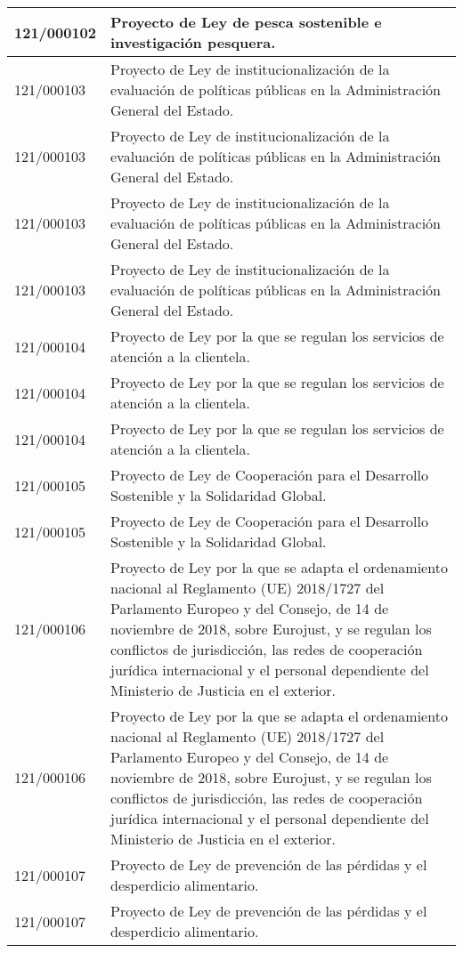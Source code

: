 {\begin{table}[H]
\begin{center}
\begin{tabularx}{\linewidth}{| l | X |}
\hline
121/000102 & Proyecto de Ley de pesca sostenible e investigación pesquera. \\
\hline
121/000103 & Proyecto de Ley de institucionalización de la evaluación de políticas públicas en la Administración General del Estado. \\
\hline
121/000103 & Proyecto de Ley de institucionalización de la evaluación de políticas públicas en la Administración General del Estado. \\
\hline
121/000103 & Proyecto de Ley de institucionalización de la evaluación de políticas públicas en la Administración General del Estado. \\
\hline
121/000103 & Proyecto de Ley de institucionalización de la evaluación de políticas públicas en la Administración General del Estado. \\
\hline
121/000104 & Proyecto de Ley por la que se regulan los servicios de atención a la clientela. \\
\hline
121/000104 & Proyecto de Ley por la que se regulan los servicios de atención a la clientela. \\
\hline
121/000104 & Proyecto de Ley por la que se regulan los servicios de atención a la clientela. \\
\hline
121/000105 & Proyecto de Ley de Cooperación para el Desarrollo Sostenible y la Solidaridad Global. \\
\hline
121/000105 & Proyecto de Ley de Cooperación para el Desarrollo Sostenible y la Solidaridad Global. \\
\hline
121/000106 & Proyecto de Ley por la que se adapta el ordenamiento nacional al Reglamento (UE) 2018/1727 del Parlamento Europeo y del Consejo, de 14 de noviembre de 2018, sobre Eurojust, y se regulan los conflictos de jurisdicción, las redes de cooperación jurídica internacional y el personal dependiente del Ministerio de Justicia en el exterior. \\
\hline
121/000106 & Proyecto de Ley por la que se adapta el ordenamiento nacional al Reglamento (UE) 2018/1727 del Parlamento Europeo y del Consejo, de 14 de noviembre de 2018, sobre Eurojust, y se regulan los conflictos de jurisdicción, las redes de cooperación jurídica internacional y el personal dependiente del Ministerio de Justicia en el exterior. \\
\hline
121/000107 & Proyecto de Ley de prevención de las pérdidas y el desperdicio alimentario. \\
\hline
121/000107 & Proyecto de Ley de prevención de las pérdidas y el desperdicio alimentario. \\

\end{tabularx}
\end{center}
\end{table}}
